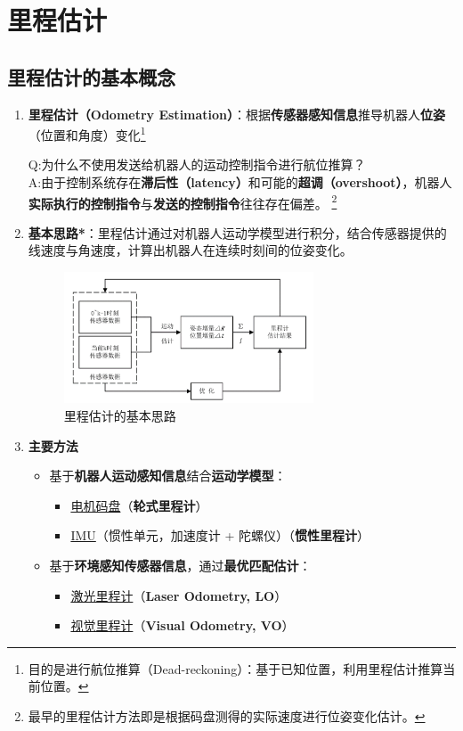 \documentclass[../main.tex]{subfiles}
\begin{document}
\section{里程估计}
\subsection{里程估计的基本概念}
\begin{enumerate}
    \item \textbf{里程估计（Odometry Estimation）}：根据\textbf{传感器感知信息}推导机器人\textbf{位姿}（位置和角度）变化\footnote{目的是进行航位推算（Dead-reckoning）：基于已知位置，利用里程估计推算当前位置。}\\
    \begin{small}\kaishu
    Q:为什么不使用发送给机器人的运动控制指令进行航位推算？
    \\
    A:由于控制系统存在\textbf{滞后性（latency）}和可能的\textbf{超调（overshoot）}，机器人\textbf{实际执行的控制指令}与\textbf{发送的控制指令}往往存在偏差。 \footnote{最早的里程估计方法即是根据码盘测得的实际速度进行位姿变化估计。}  
    \end{small}

    \item \textbf{基本思路*}：里程估计通过对机器人运动学模型进行积分，结合传感器提供的线速度与角速度，计算出机器人在连续时刻间的位姿变化。
    \begin{figure}[H]
        \centering
        \includegraphics[width=0.7\textwidth]{images/odom.png}
        \caption{里程估计的基本思路}
    \end{figure}
    \item \textbf{主要方法}
    \begin{itemize}
        \item 基于\textbf{机器人运动感知信息}结合\textbf{运动学模型}：
        \begin{itemize}
            \item \hyperref[mapan]{电机码盘}（\textbf{轮式里程计}）
            \item \hyperref[imu]{IMU}（惯性单元，加速度计 + 陀螺仪）（\textbf{惯性里程计}）
        \end{itemize}
        \item 基于\textbf{环境感知传感器信息}，通过\textbf{最优匹配估计}：
        \begin{itemize}
            \item \hyperref[laser]{激光里程计}（\textbf{Laser Odometry, LO}）
            \item \hyperref[visual]{视觉里程计}（\textbf{Visual Odometry, VO}）
        \end{itemize}
    \end{itemize}


\end{enumerate}
\end{document}
